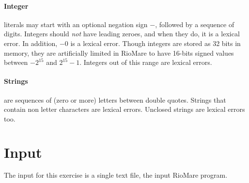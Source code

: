 \documentclass{article}
\begin{document}
\paragraph{Integer} literals may start with an optional negation sign $-$,
followed by a sequence of digits.
Integers should \textit{not} have leading zeroes,
and when they do, it is a lexical error.
In addition, $-0$ is a lexical error.
Though integers are stored as 32 bits in memory,
they are artificially limited in RioMare to have
16-bits signed values between $-2^{15}$ and $2^{15}-1$.
Integers out of this range are lexical errors.
\paragraph{Strings} are sequences of (zero or more) letters between double quotes.
Strings that contain non letter characters are lexical errors.
Unclosed strings are lexical errors too.
\section{Input}
The input for this exercise is a single text file, the input RioMare program.
\end{document}

